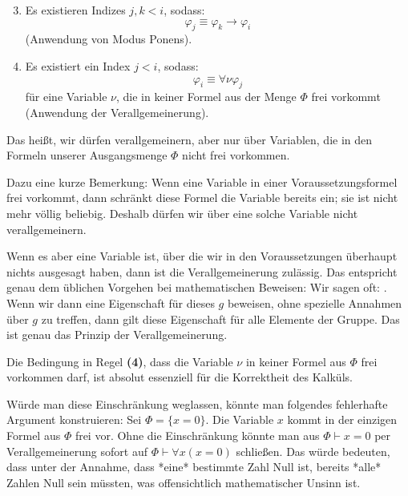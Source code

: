 \begin{math-stroke}
\begin{enumerate}[label=\textbf{(\arabic*)}]
    \setcounter{enumi}{2} \item Es existieren Indizes $j, k < i$, sodass:
    \begin{equation}\label{eq:beweis-mp}
    \varphi_j \equiv \varphi_k \rightarrow \varphi_i
    \end{equation}
    (Anwendung von Modus Ponens).
    
    \item Es existiert ein Index $j < i$, sodass:
    \begin{equation}\label{eq:beweis-v}
    \varphi_i \equiv \forall \nu \varphi_j
    \end{equation}
    für eine Variable $\nu$, die in keiner Formel aus der Menge $\Phi$ frei vorkommt (Anwendung der Verallgemeinerung).
\end{enumerate}
\end{math-stroke}

\begin{spoken-clean}[00:22:22 - 00:24:30]
Das heißt, wir dürfen verallgemeinern, aber nur über Variablen, die in den Formeln unserer Ausgangsmenge $\Phi$ nicht frei vorkommen. 

Dazu eine kurze Bemerkung: Wenn eine Variable in einer Voraussetzungsformel frei vorkommt, dann schränkt diese Formel die Variable bereits ein; sie ist nicht mehr völlig beliebig. Deshalb dürfen wir über eine solche Variable nicht verallgemeinern. 

Wenn es aber eine Variable ist, über die wir in den Voraussetzungen überhaupt nichts ausgesagt haben, dann ist die Verallgemeinerung zulässig. Das entspricht genau dem üblichen Vorgehen bei mathematischen Beweisen: Wir sagen oft: . Wenn wir dann eine Eigenschaft für dieses $g$ beweisen, ohne spezielle Annahmen über $g$ zu treffen, dann gilt diese Eigenschaft für alle Elemente der Gruppe. Das ist genau das Prinzip der Verallgemeinerung.
\end{spoken-clean}

\begin{didactic-insight}
Die Bedingung in Regel \textbf{(4)}, dass die Variable $\nu$ in keiner Formel aus $\Phi$ frei vorkommen darf, ist absolut essenziell für die Korrektheit des Kalküls. 

Würde man diese Einschränkung weglassen, könnte man folgendes fehlerhafte Argument konstruieren: Sei $\Phi = \{x = 0\}$. Die Variable $x$ kommt in der einzigen Formel aus $\Phi$ frei vor. Ohne die Einschränkung könnte man aus $\Phi \vdash x = 0$ per Verallgemeinerung sofort auf $\Phi \vdash \forall x (x = 0)$ schließen. Das würde bedeuten, dass unter der Annahme, dass *eine* bestimmte Zahl Null ist, bereits *alle* Zahlen Null sein müssten, was offensichtlich mathematischer Unsinn ist.
\end{didactic-insight}

